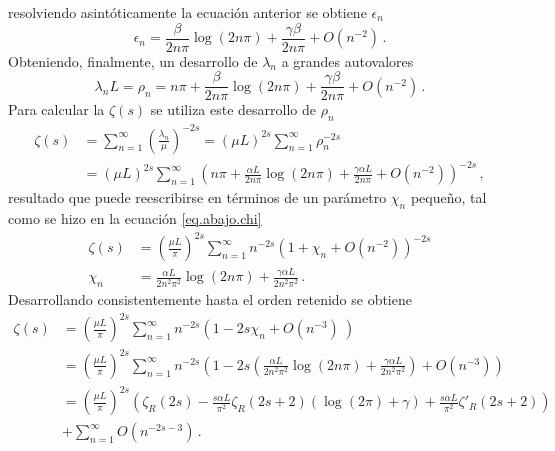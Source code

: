 resolviendo asintóticamente la ecuación anterior se obtiene $\epsilon _n$
\begin{equation}\label{anterior}
    \epsilon _n =  \frac{\beta }{2 n \pi} \log (2 n \pi) +
                \frac{\gamma \beta}{2 n \pi} +
                O\left(  n^{-2} \right)
                	\, .
\end{equation}
Obteniendo, finalmente, un desarrollo de  $\lambda _n$ a grandes autovalores
\begin{equation}
	\lambda _n L= 
	\rho _n = 
	n \pi
	+ \frac{\beta }{2 n \pi} \log (2 n \pi)
	+ \frac{\gamma \beta}{2 n \pi}
	+ O ( n^{-2} )
\, .
\end{equation}
Para calcular la $\zeta (s)$ se utiliza este desarrollo de $\rho _n$
\begin{equation*}
\begin{aligned}
    \zeta (s) &= \sum _{n=1} ^{\infty} \left( \frac{\lambda _n}{\mu} \right) ^{-2 s}  
    = ( \mu L) ^{2 s} \sum _{n=1} ^{\infty}  \rho _n  ^{-2 s}  \\
    & =    ( \mu L) ^{2 s} \sum _{n=1} ^{\infty} 
    \left( 
    n \pi + \frac{\alpha L }{2 n \pi} \log (2 n \pi) + \frac{\gamma \alpha L}{2 n \pi} +
    O \left( n^{-2} \right)
    \right) ^{-2s}
    	\, ,
\end{aligned}
\end{equation*}
resultado que puede reescribirse en términos de un parámetro $\chi _n$ pequeño, tal como se hizo en la ecuación \eqref{eq.abajo.chi}
\begin{equation}
\begin{aligned}
    \zeta  (s) &= \left( \frac{\mu L }{\pi} \right)  ^{2 s} 
    \sum _{n=1} ^{\infty} n ^{- 2  s} 
    \left(
    	1 + \chi _n  + O( n^{-2} )
    	\right) ^{-2 s} \\[5pt]
		 \chi _n &= 
    	\frac{\alpha L  }{2 n^2 \pi ^2} \log (2 n \pi) + 
    	\frac{\gamma \alpha L}{2 n^2 \pi ^2 }  
    			\, .
\end{aligned}
\end{equation}
Desarrollando consistentemente hasta el orden retenido se obtiene
\begin{align}\label{eq.zeta.c}
    \zeta  (s) &= \left( \frac{\mu L}{\pi} \right) ^{2 s}
    \sum _{n=1} ^{\infty} 
    n ^{-2s}
    \left(
    1 - 2 s \chi _n + O \left( n ^{-3} \right) \
    \right)   \nonumber \\[5pt]
     &= \left( \frac{\mu L }{\pi} \right) ^{2 s}
    \sum _{n=1} ^{\infty} n ^{-2 s} 
    \left(
    1 - 2s \left(
    \frac{\alpha L }{2 n ^2 \pi ^2} \log ( 2  n \pi) + 
    \frac{\gamma \alpha L }{2 n ^2 \pi ^2} 
	\right) +
    O \left( n ^{-3}   \right)
    \right) \nonumber \\[5pt]
    &=   \left( \frac{\mu L }{ \pi } \right) ^{2 s}  
    \left( \zeta _R (2 s) -
	\frac{ s \alpha L}{ \pi ^2} \zeta _R (2s+2)
	\left(
	    \log (2  \pi ) + \gamma
	\right) + 
    \frac{s \alpha L}{\pi ^2}
	\zeta ' _R(2s+2) \right) \nonumber \\[5pt]
	& + \sum _{n=1} ^{\infty} O \left( n ^{-2s-3} \right) \, .
\end{align}    
